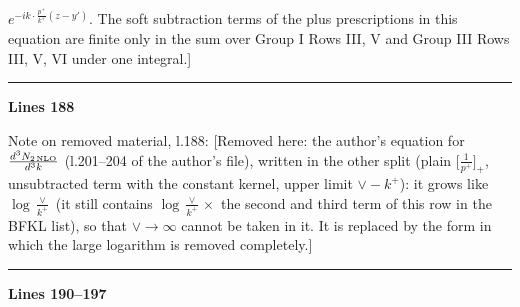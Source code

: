 \documentclass[10pt]{article}
\newenvironment{notebox}{\def\FrameCommand{{\color{notebar}\vrule width 1.5pt}\hspace{6pt}}\MakeFramed{\advance\hsize-\width\FrameRestore}\small}{\endMakeFramed}
\begin{document}
$e^{-ik\cdot\frac{p^{+}}{k^{+}}(z-y')}$. The soft subtraction terms of the plus prescriptions in this equation are finite only in the sum over Group I Rows III, V and Group III Rows III, V, VI under one integral.]\end{notebox}
\noindent{\small\textsf{Unmarked edit, l.183 (deleted):} \texttt{\textbackslash{}\allowbreak{}\{\textbackslash{}\allowbreak{}rho\^{}\{c\}\allowbreak{}(y)\allowbreak{},\allowbreak{}\textbackslash{}\allowbreak{}rho\^{}\{b\}\allowbreak{}(x)\allowbreak{}\textbackslash{}\allowbreak{}\}\allowbreak{}-U\^{}\{cb\}\allowbreak{}(z)\allowbreak{}\textbackslash{}\allowbreak{},\allowbreak{}U\^{}\{ad\}\allowbreak{}(y)\allowbreak{}\textbackslash{}\allowbreak{},\allowbreak{}U\^{}\{ce\}\allowbreak{}(x)\allowbreak{}\textbackslash{}\allowbreak{},\allowbreak{}\textbackslash{}\allowbreak{}\{\textbackslash{}\allowbreak{}rho\^{}\{d\}\allowbreak{}(y)\allowbreak{},\allowbreak{}\textbackslash{}\allowbreak{}rho\^{}\{e\}\allowbreak{}(x)\allowbreak{}\textbackslash{}\allowbreak{}\}\allowbreak{}\textbackslash{}\allowbreak{}right]}}\par
{}\noindent\rule{\linewidth}{0.3pt}\par\noindent\textbf{Lines 188}\par
\begin{notebox}\textsf{\small Note on removed material, l.188:} [Removed here: the author's equation for $\frac{d^{3}N_{2\,\rm NLO}}{d^{3}k}$ (l.201--204 of the author's file), written in the other split (plain $\big[\frac{1}{p^{+}}\big]_{+}$, unsubtracted term with the constant kernel, upper limit $\vee-k^{+}$): it grows like $\log\frac{\vee}{k^{+}}$ (it still contains $\log\frac{\vee}{k^{+}}\times$ the second and third term of this row in the BFKL list), so that $\vee\to\infty$ cannot be taken in it. It is replaced by the form in which the large logarithm is removed completely.]\end{notebox}
\noindent\rule{\linewidth}{0.3pt}\par\noindent\textbf{Lines 190--197} \par
\end{document}
